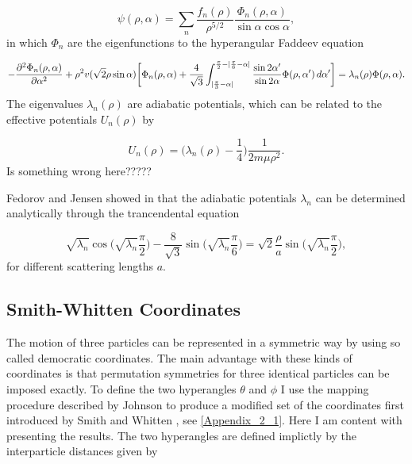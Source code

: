 \begin{equation}
\psi(\rho,\alpha) = \sum_{n}\frac{f_n(\rho)}{\rho^{5/2}} \frac{\Phi_n(\rho,\alpha)}{\sin \alpha \cos \alpha},
\end{equation}
in which $\Phi_n$ are the eigenfunctions to the hyperangular Faddeev equation

\begin{equation}\label{eq:faddeev_hyperang}
-\frac{\partial^2\Phi_n(\rho,\alpha)}{\partial \alpha^2} + \rho^2 v(\sqrt{2}\rho\sin \alpha)\bigg[\Phi_n(\rho,\alpha) + \frac{4}{\sqrt{3}} \int_{\lvert\frac{\pi}{3}-\alpha\rvert}^{\frac{\pi}{2}-\lvert\frac{\pi}{6}-\alpha\rvert} \frac{\sin 2\alpha'}{\sin 2\alpha}\Phi(\rho,\alpha') \, d\alpha'\bigg] = \lambda_n(\rho)\Phi(\rho,\alpha).
\end{equation}
The eigenvalues $\lambda_{n}(\rho)$ are adiabatic potentials, which can be related to the effective potentials $U_{n}(\rho)$ by 

\begin{equation}\label{eq:faddeev_effectivepot}
U_{n}(\rho) = \Big(\lambda_n(\rho)-\frac{1}{4}\Big)\frac{1}{2 m \mu \rho^2}.
\end{equation}
Is something wrong here?????

Fedorov and Jensen showed in \cite{Fedorov1993} that the adiabatic potentials $\lambda_n$ can be determined analytically through the trancendental equation

\begin{equation}\label{eq:transcendental}
\sqrt{\lambda_n} \cos{\bigg(\sqrt{\lambda_n} \frac{\pi}{2}\bigg)} - \frac{8}{\sqrt{3}}\sin{\bigg(\sqrt{\lambda_n} \frac{\pi}{6}\bigg)} = \sqrt{2}\frac{\rho}{a}\sin{\bigg(\sqrt{\lambda_n} \frac{\pi}{2}\bigg)}, 
\end{equation}
for different scattering lengths $a$.
\subsection{Smith-Whitten Coordinates}\label{smith_whitten}
The motion of three particles can be represented in a symmetric way by using so called democratic coordinates. The main advantage with these kinds of coordinates is that permutation symmetries for three identical particles can be imposed exactly. To define the two hyperangles $\theta$ and $\phi$ I use the mapping procedure described by Johnson \cite{Johnson1980} to produce a modified set of the coordinates first introduced by Smith and Whitten \cite{Smith_Whitten1968}, see \cref{Appendix_2_1}. Here I am content with presenting the results. The two hyperangles are defined implictly by the interparticle distances given by 

